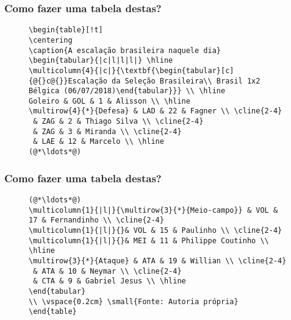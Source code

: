 \begin{frame}[fragile] \frametitle{Como fazer uma tabela destas?}

\begin{figure}[!t]
\begin{lstlisting}
\begin{table}[!t]
\centering
\caption{A escalação brasileira naquele dia}
\begin{tabular}{|c|l|l|l|} \hline
\multicolumn{4}{|c|}{\textbf{\begin{tabular}[c]{@{}c@{}}Escalação da Seleção Brasileira\\ Brasil 1x2 Bélgica (06/07/2018)\end{tabular}}} \\ \hline
Goleiro & GOL & 1 & Alisson \\ \hline
\multirow{4}{*}{Defesa} & LAD & 22 & Fagner \\ \cline{2-4} 
 & ZAG & 2 & Thiago Silva \\ \cline{2-4} 
 & ZAG & 3 & Miranda \\ \cline{2-4} 
 & LAE & 12 & Marcelo \\ \hline
(@*\ldots*@)
\end{lstlisting}
\end{figure}
\end{frame}

\begin{frame}[fragile] \frametitle{Como fazer uma tabela destas?}
\begin{figure}[!t]
\begin{lstlisting}
(@*\ldots*@)
\multicolumn{1}{|l|}{\multirow{3}{*}{Meio-campo}} & VOL & 17 & Fernandinho \\ \cline{2-4} 
\multicolumn{1}{|l|}{}& VOL & 15 & Paulinho \\ \cline{2-4} 
\multicolumn{1}{|l|}{}& MEI & 11 & Philippe Coutinho \\ \hline
\multirow{3}{*}{Ataque} & ATA & 19 & Willian \\ \cline{2-4} 
 & ATA & 10 & Neymar \\ \cline{2-4} 
 & CTA & 9 & Gabriel Jesus \\ \hline
\end{tabular}
\\ \vspace{0.2cm} \small{Fonte: Autoria própria}
\end{table}
\end{lstlisting}
\end{figure}
\end{frame}


